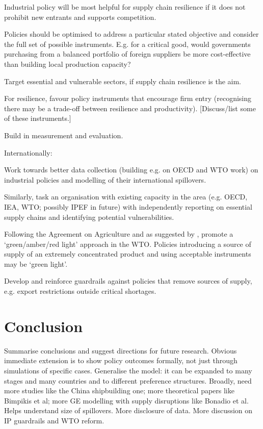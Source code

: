 \documentclass{article}
\begin{document}
Industrial policy will be most helpful for supply chain resilience if it does not prohibit new entrants and supports competition.  

Policies should be optimised to address a particular stated objective and consider the full set of possible instruments. E.g. for a critical good, would governments purchasing from a balanced portfolio of foreign suppliers be more cost-effective than building local production capacity? 

Target essential and vulnerable sectors, if supply chain resilience is the aim.  

For resilience, favour policy instruments that encourage firm entry (recognising there may be a trade-off between resilience and productivity). [Discuss/list some of these instruments.] 

Build in measurement and evaluation.  

Internationally: 

Work towards better data collection (building e.g. on OECD and WTO work) on industrial policies and modelling of their international spillovers. 

Similarly, task an organisation with existing capacity in the area (e.g. OECD, IEA, WTO; possibly IPEF in future) with independently reporting on essential supply chains and identifying potential vulnerabilities.  

Following the Agreement on Agriculture and as suggested by \textcite{bown_wtoing_2019}, promote a ‘green/amber/red light’ approach in the WTO. Policies introducing a source of supply of an extremely concentrated product and using acceptable instruments may be ‘green light’. 

Develop and reinforce guardrails against policies that remove sources of supply, e.g. export restrictions outside critical shortages.

\section{Conclusion}

Summarise conclusions and suggest directions for future research. Obvious immediate extension is to show policy outcomes formally, not just through simulations of specific cases. Generalise the model: it can be expanded to many stages and many countries and to different preference structures. Broadly, need more studies like the China shipbuilding one; more theoretical papers like Bimpikis et al; more GE modelling with supply disruptions like Bonadio et al. Helps understand size of spillovers. More disclosure of data. More discussion on IP guardrails and WTO reform.

\printbibliography
\end{document}
